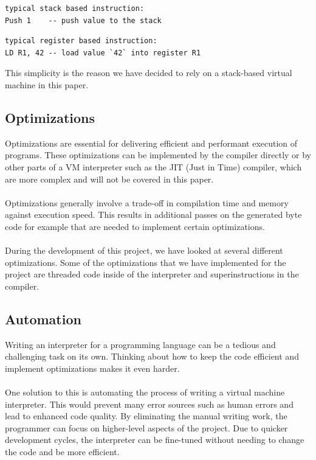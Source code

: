 \documentclass{article}
\begin{document}
\begin{verbatim}
typical stack based instruction:
Push 1    -- push value to the stack
\end{verbatim}

\begin{verbatim}
typical register based instruction:
LD R1, 42 -- load value `42` into register R1
\end{verbatim}

This simplicity is the reason we have decided to rely on a stack-based virtual machine in
this paper.

\subsection{Optimizations}
Optimizations are essential for delivering efficient and performant execution of
programs. These optimizations can be implemented by the compiler directly or
by other parts of a VM interpreter such as the JIT (Just in Time) compiler, which
are more complex and will not be covered in this paper.
\\ \\
Optimizations generally involve a trade-off in compilation time and memory
against execution speed. This results in additional passes on the generated
byte code for example that are needed to implement certain optimizations.
\\ \\
During the development of this project, we have looked at several different
optimizations. Some of the optimizations that we have implemented for the
project are threaded code inside of the interpreter and superinstructions in
the compiler.

\subsection{Automation}
Writing an interpreter for a programming language can be a tedious and
challenging task on its own. Thinking about how to keep the code efficient and
implement optimizations makes it even harder.
\\ \\ 
One solution to this is automating the process of writing a virtual machine
interpreter. This would prevent many error sources such as human errors and
lead to enhanced code quality. By eliminating the manual writing work, the
programmer can focus on higher-level aspects of the project. Due to quicker
development cycles, the interpreter can be fine-tuned without needing to change
the code and be more efficient.
\end{document}
